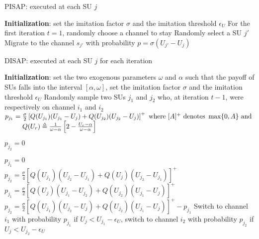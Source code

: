 \documentclass[12pt, onecolumn]{IEEEtran}
\theoremstyle{plain}
\theoremstyle{definition}
\begin{document}
\newpage

\begin{algorithm}
\caption{PISAP: executed at each SU $j$}
\begin{algorithmic}[1]
\STATE \textbf{Initialization}: set the imitation factor $\sigma$ and the imitation threshold $\epsilon_U$
\STATE For the first iteration $t=1$, randomly choose a channel to stay
    \STATE Randomly select a SU $j'$
        \STATE Migrate to the channel $s_{j'}$ with probability $p=\sigma (U_{j'}-U_j)$
    \ENDIF
\ENDWHILE
\end{algorithmic}
\label{algo:pir}
\end{algorithm}

\begin{algorithm}
\caption{DISAP: executed at each SU $j$ for each iteration}
\begin{algorithmic}[1]
\STATE \textbf{Initialization}: set the two exogenous parameters $\omega$ and $\alpha$ such that the payoff of SUs falls into the interval $[\alpha,\omega]$, set the imitation factor $\sigma$ and the imitation threshold $\epsilon_U$
\STATE Randomly sample two SUs $j_1$ and $j_2$ who, at iteration $t-1$, were respectively on channel $i_1$ and $i_2$
\STATE  $ \begin{array}{@{\hspace{-0mm}}r@{\;}l@{\hspace{0mm}}}
p_{j_1} = & \frac{\sigma }{2}\left[Q(U_{j_1})(U_{j_1}-U_{j})+Q(U_{j_2})(U_{j_2}-U_j)\right]^+ \mbox{ where } [A]^+ \mbox{ denotes } \max \{0, A\} \mbox{ and }\\ & Q(U_r)\triangleq\frac{1}{\omega - \alpha}\left[2 - \frac{U_r-\alpha}{\omega - \alpha}\right]\\
\end{array}
$ \hfill \phantom{.}



$p_{j_2}=0$



\STATE $p_{j_1}=0$\\
$p_{j_2}=\frac{\sigma }{4}\left[Q(U_{j_1})(U_{j_2}-U_{j_1})+Q(U_j)(U_{j_2}-U_{j_1})\right]^+$
\ELSE
\STATE $p_{j_1} =\frac{\sigma }{2}\left[Q(U_j)(U_{j_1}-U_{j_2})+Q(U_{j_2})(U_{j_1}-U_j)\right]^+$\\
$p_{j_2}=\frac{\sigma }{2}\left[Q(U_{j_1})(U_{j_2}-U_j)+Q(U_{j_2})(U_{j_1}-U_j)\right]^+-p_{j_1}$
\ENDIF
\STATE Switch to channel $i_1$ with probability $p_{j_1}$ if $U_j<U_{j_1}-\epsilon_U$, switch to channel $i_2$ with probability $p_{j_2}$ if $U_j<U_{j_2}-\epsilon_U$
\end{algorithmic}
\label{algo:apir}
\end{algorithm}
\end{document}
